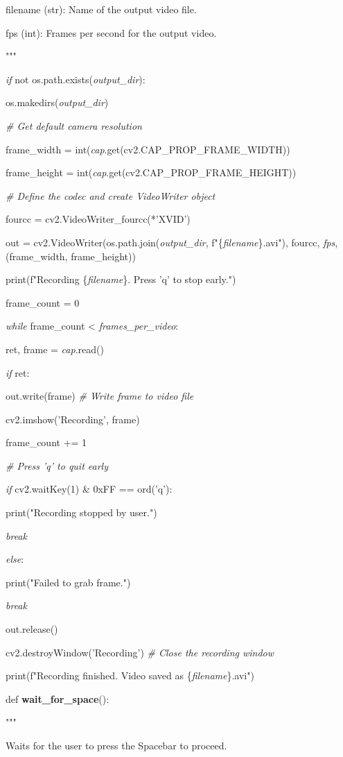 \documentclass[
]{article}
\begin{document}
filename (str): Name of the output video file.

fps (int): Frames per second for the output video.

"""

\emph{if} not os.path.exists(\emph{output\_dir}):

os.makedirs(\emph{output\_dir})

\emph{\# Get default camera resolution}

frame\_width = int(\emph{cap}.get(cv2.CAP\_PROP\_FRAME\_WIDTH))

frame\_height = int(\emph{cap}.get(cv2.CAP\_PROP\_FRAME\_HEIGHT))

\emph{\# Define the codec and create VideoWriter object}

fourcc = cv2.VideoWriter\_fourcc(*'XVID')

out = cv2.VideoWriter(os.path.join(\emph{output\_dir}, f"\{\emph{filename}\}.avi"), fourcc, \emph{fps}, (frame\_width, frame\_height))

print(f"Recording \{\emph{filename}\}. Press 'q' to stop early.")

frame\_count = 0

\emph{while} frame\_count \textless{} \emph{frames\_per\_video}:

ret, frame = \emph{cap}.read()

\emph{if} ret:

out.write(frame) \emph{\# Write frame to video file}

cv2.imshow('Recording', frame)

frame\_count += 1

\emph{\# Press 'q' to quit early}

\emph{if} cv2.waitKey(1) \& 0xFF == ord('q'):

print("Recording stopped by user.")

\emph{break}

\emph{else}:

print("Failed to grab frame.")

\emph{break}

out.release()

cv2.destroyWindow('Recording') \emph{\# Close the recording window}

print(f"Recording finished. Video saved as \{\emph{filename}\}.avi")

def \textbf{wait\_for\_space}():

"""

Waits for the user to press the Spacebar to proceed.
\end{document}
